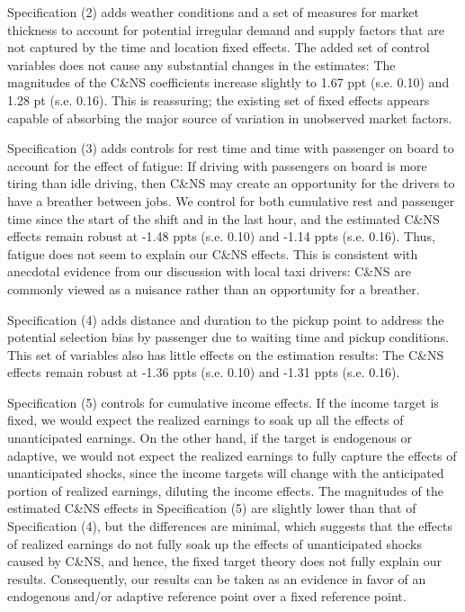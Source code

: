 \documentclass[reviewmode,AEJ]{AEA}
\begin{document}
Specification (2) adds weather conditions and a set of measures for market thickness to account for potential irregular demand and supply factors that are not captured by the time and location fixed effects. The added set of control variables does not cause any substantial changes in the estimates: The magnitudes of the C\&NS coefficients increase slightly to 1.67 ppt (s.e. 0.10) and 1.28 pt (s.e. 0.16). This is reassuring; the existing set of fixed effects appears capable of absorbing the major source of variation in unobserved market factors.

Specification (3) adds controls for rest time and time with passenger on board to account for the effect of fatigue: If driving with passengers on board is more tiring than idle driving, then C\&NS may create an opportunity for the drivers to have a breather between jobs. We control for both cumulative rest and passenger time since the start of the shift and in the last hour, and the estimated C\&NS effects remain robust at -1.48 ppts (s.e. 0.10) and -1.14 ppts (s.e. 0.16). Thus, fatigue does not seem to explain our C\&NS effects. This is consistent with anecdotal evidence from our discussion with local taxi drivers: C\&NS are commonly viewed as a nuisance rather than an opportunity for a breather.

Specification (4) adds distance and duration to the pickup point to address the potential selection bias by passenger due to waiting time and pickup conditions. This set of variables also has little effects on the estimation results: The C\&NS effects remain robust at -1.36 ppts (s.e. 0.10) and -1.31 ppts (s.e. 0.16).

Specification (5) controls for cumulative income effects. If the income target is fixed, we would expect the realized earnings to soak up all the effects of unanticipated earnings. On the other hand, if the target is endogenous or adaptive, we would not expect the realized earnings to fully capture the effects of unanticipated shocks, since the income targets will change with the anticipated portion of realized earnings, diluting the income effects. The magnitudes of the estimated C\&NS effects in Specification (5) are slightly lower than that of Specification (4), but the differences %
are minimal, which suggests that the effects of realized earnings do not fully soak up the effects of unanticipated shocks caused by C\&NS, and hence, the fixed target theory does not fully explain our results. Consequently, our results can be taken as an evidence in favor of an endogenous and/or adaptive reference point over a fixed reference point. 
\end{document}
